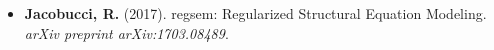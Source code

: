 \documentclass[letterpaper,10pt]{article}
\begin{document}
\begin{itemize}
\item[] \textbf{Jacobucci, R.} (2017). regsem: Regularized Structural Equation Modeling. \emph{arXiv preprint arXiv:1703.08489}.
\vspace{3mm}
%
%
\begin{comment}
\item {\textbf{\large{Manuscripts Under Review}}}
%
\item[] \textbf{Jacobucci, R.}. (under review). Are decision trees reliable enough for psychological research?
%
\item[] Ammerman, B.A., \textbf{Jacobucci, R.}, Turner, B. J., Dixon-Gordon, K., \& McCloskey, M.S. (under review). Quantifying the importance of lifetime frequency versus number of methods used in the consideration of NSSI severity.
%
\item{\textbf{\large{Manuscripts in Preparation}}} 
%
\item[] Grimm, K. J., \& \textbf{Jacobucci, R.}. (in preparation). Reliable trees: Reliability informed recursive partitioning for psychological data. 
\end{comment}
%
%
%

%
%
%


\end{itemize} 
\end{document}
